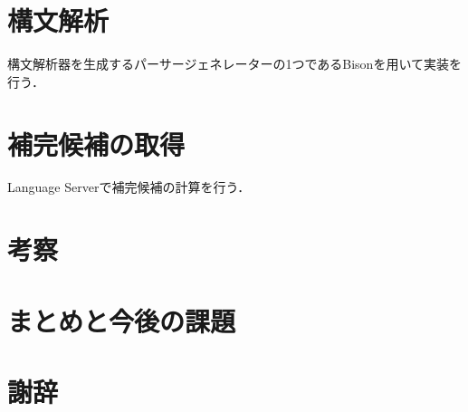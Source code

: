 \documentclass[12pt,a4j]{jreport}
\begin{document}
\chapter{構文解析}
構文解析器を生成するパーサージェネレーターの1つであるBison\cite{bison}を用いて実装を行う．





\chapter{補完候補の取得}
Language Serverで補完候補の計算を行う\cite{lsp}．






\chapter{考察}




\chapter{まとめと今後の課題}










\chapter*{謝辞}


\newpage


\end{document}
